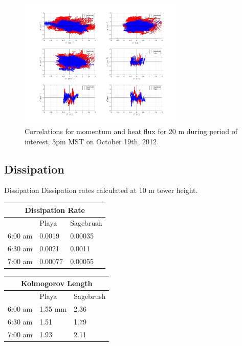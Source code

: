 \documentclass{beamer}
\begin{document}
\begin{frame}
	\begin{figure}[t!]
		\centering
		\includegraphics[width=0.7\textwidth]{plots/momentum_corr_20m}
		\caption{Correlations for momentum and heat flux for 20 m during period of interest, 3pm MST on October 19th, 2012}
	\end{figure}
	
\end{frame}

\subsection{Dissipation}
\begin{frame}{Dissipation}
Dissipation rates calculated at 10 m tower height.
\begin{table}
\begin{minipage}[b]{0.45\linewidth}
\centering
\begin{tabular}{| p || p | p |}
	\hline
	\multicolumn{3}{|c|}{Dissipation Rate} \\
	\hline
	& Playa & Sagebrush \\
	\hline
	6:00 am & 0.0019 & 0.00035 \\
	6:30 am & 0.0021 & 0.0011 \\
	7:00 am & 0.00077 & 0.00055 \\
	\hline
\end{tabular}
\end{minipage}%
\begin{minipage}[b]{0.45\linewidth}
\centering
\begin{tabular}{| p || p | p |}
	\hline
	\multicolumn{3}{|c|}{Kolmogorov Length} \\
	\hline
	& Playa & Sagebrush \\
	\hline
	6:00 am & 1.55 mm & 2.36 \\
	6:30 am & 1.51 & 1.79 \\
	7:00 am & 1.93 & 2.11 \\
	\hline
\end{tabular}
\end{minipage}%
\end{table}
\end{frame}
\end{document}
